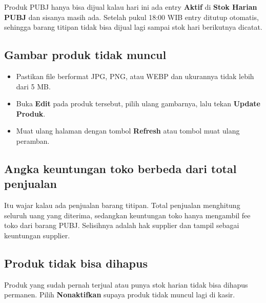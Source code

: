 \documentclass[11pt,a4paper]{article}
\newcommand{\ui}[1]{\textbf{#1}}
\begin{document}
Produk PUBJ hanya bisa dijual kalau hari ini ada entry \ui{Aktif} di \ui{Stok Harian PUBJ} dan sisanya masih ada. Setelah pukul 18:00 WIB entry ditutup otomatis, sehingga barang titipan tidak bisa dijual lagi sampai stok hari berikutnya dicatat.

\subsection{Gambar produk tidak muncul}

\begin{itemize}
  \item Pastikan file berformat JPG, PNG, atau WEBP dan ukurannya tidak lebih dari 5 MB.
  \item Buka \ui{Edit} pada produk tersebut, pilih ulang gambarnya, lalu tekan \ui{Update Produk}.
  \item Muat ulang halaman dengan tombol \ui{Refresh} atau tombol muat ulang peramban.
\end{itemize}

\subsection{Angka keuntungan toko berbeda dari total penjualan}

Itu wajar kalau ada penjualan barang titipan. Total penjualan menghitung seluruh uang yang diterima, sedangkan keuntungan toko hanya mengambil fee toko dari barang PUBJ. Selisihnya adalah hak supplier dan tampil sebagai keuntungan supplier.

\subsection{Produk tidak bisa dihapus}

Produk yang sudah pernah terjual atau punya stok harian tidak bisa dihapus permanen. Pilih \ui{Nonaktifkan} supaya produk tidak muncul lagi di kasir.
\end{document}
